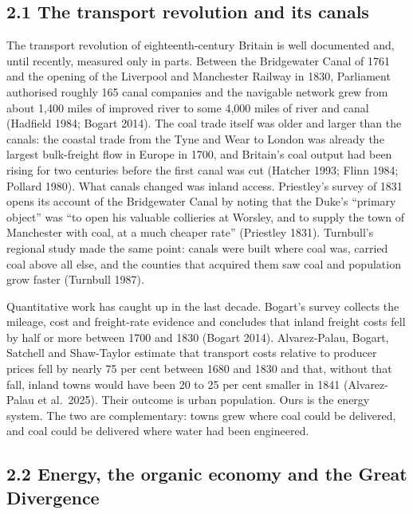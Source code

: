 \documentclass[
  11pt,
]{article}
\begin{document}
\subsection{2.1 The transport revolution and its
canals}\label{the-transport-revolution-and-its-canals}

The transport revolution of eighteenth-century Britain is well
documented and, until recently, measured only in parts. Between the
Bridgewater Canal of 1761 and the opening of the Liverpool and
Manchester Railway in 1830, Parliament authorised roughly 165 canal
companies and the navigable network grew from about 1,400 miles of
improved river to some 4,000 miles of river and canal (Hadfield 1984;
Bogart 2014). The coal trade itself was older and larger than the
canals: the coastal trade from the Tyne and Wear to London was already
the largest bulk-freight flow in Europe in 1700, and Britain's coal
output had been rising for two centuries before the first canal was cut
(Hatcher 1993; Flinn 1984; Pollard 1980). What canals changed was inland
access. Priestley's survey of 1831 opens its account of the Bridgewater
Canal by noting that the Duke's ``primary object'' was ``to open his
valuable collieries at Worsley, and to supply the town of Manchester
with coal, at a much cheaper rate'' (Priestley 1831). Turnbull's
regional study made the same point: canals were built where coal was,
carried coal above all else, and the counties that acquired them saw
coal and population grow faster (Turnbull 1987).

Quantitative work has caught up in the last decade. Bogart's survey
collects the mileage, cost and freight-rate evidence and concludes that
inland freight costs fell by half or more between 1700 and 1830 (Bogart
2014). Alvarez-Palau, Bogart, Satchell and Shaw-Taylor estimate that
transport costs relative to producer prices fell by nearly 75 per cent
between 1680 and 1830 and that, without that fall, inland towns would
have been 20 to 25 per cent smaller in 1841 (Alvarez-Palau et al.~2025).
Their outcome is urban population. Ours is the energy system. The two
are complementary: towns grew where coal could be delivered, and coal
could be delivered where water had been engineered.

\subsection{2.2 Energy, the organic economy and the Great
Divergence}\label{energy-the-organic-economy-and-the-great-divergence}
\end{document}
